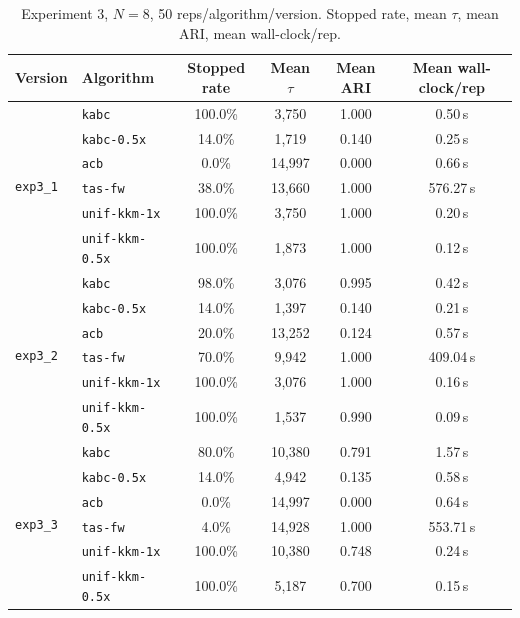 \documentclass[11pt]{article}
\begin{document}
\begin{table}[h]
\centering
\caption{Experiment 3, $N=8$, 50 reps/algorithm/version. Stopped rate, mean $\tau$, mean ARI, mean wall-clock/rep.}
\begin{tabular}{llcccc}
\toprule
Version & Algorithm & Stopped rate & Mean $\tau$ & Mean ARI & Mean wall-clock/rep \\
\midrule
\multirow{6}{*}{\texttt{exp3\_1}}
 & \texttt{kabc}        &  100.0\% &  3{,}750 & 1.000 & 0.50\,s \\
 & \texttt{kabc-0.5x}   &   14.0\% &  1{,}719 & 0.140 & 0.25\,s \\
 & \texttt{acb}         &    0.0\% & 14{,}997 & 0.000 & 0.66\,s \\
 & \texttt{tas-fw}      &   38.0\% & 13{,}660 & 1.000 & 576.27\,s \\
 & \texttt{unif-kkm-1x} &  100.0\% &  3{,}750 & 1.000 & 0.20\,s \\
 & \texttt{unif-kkm-0.5x} & 100.0\% &  1{,}873 & 1.000 & 0.12\,s \\
\midrule
\multirow{6}{*}{\texttt{exp3\_2}}
 & \texttt{kabc}        &   98.0\% &  3{,}076 & 0.995 & 0.42\,s \\
 & \texttt{kabc-0.5x}   &   14.0\% &  1{,}397 & 0.140 & 0.21\,s \\
 & \texttt{acb}         &   20.0\% & 13{,}252 & 0.124 & 0.57\,s \\
 & \texttt{tas-fw}      &   70.0\% &  9{,}942 & 1.000 & 409.04\,s \\
 & \texttt{unif-kkm-1x} &  100.0\% &  3{,}076 & 1.000 & 0.16\,s \\
 & \texttt{unif-kkm-0.5x} & 100.0\% &  1{,}537 & 0.990 & 0.09\,s \\
\midrule
\multirow{6}{*}{\texttt{exp3\_3}}
 & \texttt{kabc}        &   80.0\% & 10{,}380 & 0.791 & 1.57\,s \\
 & \texttt{kabc-0.5x}   &   14.0\% &  4{,}942 & 0.135 & 0.58\,s \\
 & \texttt{acb}         &    0.0\% & 14{,}997 & 0.000 & 0.64\,s \\
 & \texttt{tas-fw}      &    4.0\% & 14{,}928 & 1.000 & 553.71\,s \\
 & \texttt{unif-kkm-1x} &  100.0\% & 10{,}380 & 0.748 & 0.24\,s \\
 & \texttt{unif-kkm-0.5x} & 100.0\% &  5{,}187 & 0.700 & 0.15\,s \\
\bottomrule
\end{tabular}
\label{tab:exp3-summary}
\end{table}
\end{document}
